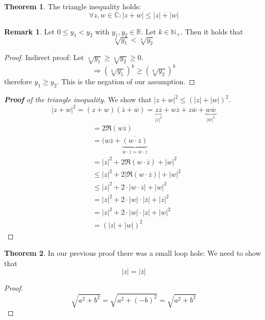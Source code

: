 \documentclass[a4paper,landscape,twocolumn]{article}
\theoremstyle{definition}
\newtheorem{theorem}{Theorem}
\newtheorem{rem}{Remark}
\newcommand\abs[1]{\left|#1\right|}
\begin{document}
\begin{theorem}
  The triangle inequality holds:
  \[ \forall z, w \in \mathbb C: \abs{z + w} \leq \abs{z} + \abs{w} \]
\end{theorem}

\begin{rem}
  Let $0 \leq y_1 < y_2$ with $y_1, y_2 \in \mathbb R$.
  Let $k \in \mathbb N_+$. Then it holds that
  \[ \sqrt[k]{y_1} < \sqrt[k]{y_2} \]
\end{rem}

\begin{proof}
  Indirect proof: Let $\sqrt[k]{y_1} \geq \sqrt[k]{y_2} \geq 0$.
  \[ \Rightarrow \left(\sqrt[k]{y_1}\right)^k \geq \left(\sqrt[k]{y_2}\right)^k \]
  therefore $y_1 \geq y_2$. This is the negation of our assumption.
\end{proof}

\begin{proof}[\textbf{Proof} of the triangle inequality]
  We show that $\abs{z + w}^2 \leq \left(\abs{z} + \abs{w}\right)^2$.
  \[
      \abs{z + w}^2 = (z + w)(\overline z + \overline w)
      = \underbrace{z \overline z}_{\abs{z}^2} + w \overline z
      + z \overline w + \underbrace{w \overline w}_{\abs{w}^2}
  \]
  \begin{align*}
      &= 2 \Re{(w \overline{z})} \\
      &= (w \overline{z} + \underbrace{\overline{(w \cdot \overline z)}}_{\overline w \cdot \overline z = \overline w \cdot z} \\
      &= \abs{z}^2 + 2\Re{(w \cdot \overline z)} + \abs{w}^2 \\
      &\leq \abs{z}^2 + 2\abs{\Re{(w \cdot \overline z)}} + \abs{w}^2 \\
      &\leq \abs{z}^2 + 2 \cdot \abs{w \cdot \overline{z}} + \abs{w}^2 \\
      &= \abs{z}^2 + 2 \cdot \abs{w} \cdot \abs{\overline{z}} + \abs{z}^2 \\
      &= \abs{z}^2 + 2 \cdot \abs{w} \cdot \abs{z} + \abs{w}^2 \\
      &= \left(\abs{z} + \abs{w}\right)^2
  \end{align*}
\end{proof}

\begin{theorem}
  In our previous proof there was a small loop hole: We need to show that
  \[ \abs{z} = \abs{\overline z} \]
\end{theorem}

\begin{proof}
  \[ \sqrt{a^2 + b^2} = \sqrt{a^2 + (-b)^2} = \sqrt{a^2 + b^2} \]
\end{proof}
\end{document}
